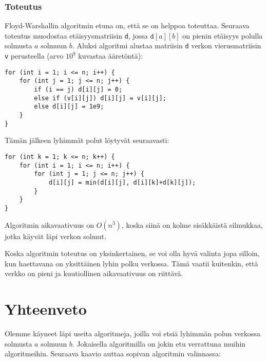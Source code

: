 \subsubsection{Toteutus}

Floyd-Warshallin algoritmin etuna on,
että se on helppoa toteuttaa.
Seuraava toteutus muodostaa etäisyysmatriisin
\texttt{d}, jossa $\texttt{d}[a][b]$
on pienin etäisyys polulla solmusta $a$ solmuun $b$.
Aluksi algoritmi alustaa matriisin \texttt{d}
verkon vierusmatriisin \texttt{v} perusteella
(arvo $10^9$ kuvastaa ääretöntä):

\begin{lstlisting}
for (int i = 1; i <= n; i++) {
    for (int j = 1; j <= n; j++) {
        if (i == j) d[i][j] = 0;
        else if (v[i][j]) d[i][j] = v[i][j];
        else d[i][j] = 1e9;
    }
}
\end{lstlisting}

Tämän jälkeen lyhimmät polut löytyvät seuraavasti:

\begin{lstlisting}
for (int k = 1; k <= n; k++) {
    for (int i = 1; i <= n; i++) {
        for (int j = 1; j <= n; j++) {
            d[i][j] = min(d[i][j], d[i][k]+d[k][j]);
        }
    }
}
\end{lstlisting}

Algoritmin aikavaativuus on
$O(n^3)$, koska siinä on kolme sisäkkäistä
silmukkaa,
jotka käyvät läpi verkon solmut.

Koska algoritmin toteutus on yksinkertainen,
se voi olla hyvä valinta jopa silloin,
kun haettavana on yksittäinen
lyhin polku verkossa.
Tämä vaatii kuitenkin, että verkko on pieni
ja kuutiollinen aikavaativuus on riittävä.

\section{Yhteenveto}

Olemme käyneet läpi useita algoritmeja,
joilla voi etsiä lyhimmän polun verkossa
solmusta $a$ solmuun $b$.
Jokaisella algoritmilla on jokin etu verrattuna
muihin algoritmeihin.
Seuraava kaavio auttaa sopivan algoritmin valinnassa:

